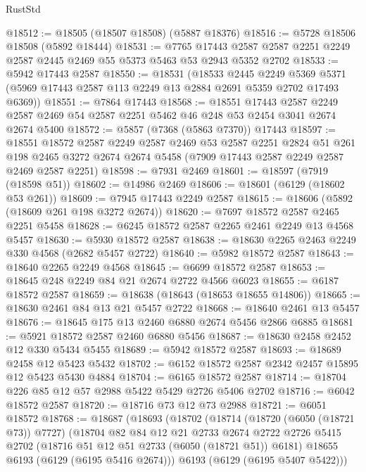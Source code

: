 \begin{lexlean}{RustStd}
\begin{coremodule}
@18512 := @18505 (@18507 @18508) (@5887 @18376)
@18516 := @5728 @18506 @18508 (@5892 @18444)
@18531 := @7765
    @17443
    @2587
    @2587
    @2251
    @2249
    @2587
    @2445
    @2469
    @55
    @5373
    @5463
    @53
    @2943
    @5352
    @2702
@18533 := @5942 @17443 @2587
@18550 := @18531
    (@18533
      @2445
      @2249
      @5369
      @5371
      (@5969 @17443 @2587 @113 @2249 @13 @2884 @2691 @5359 @2702 @17493 @6369))
@18551 := @7864 @17443
@18568 := @18551
    @17443
    @2587
    @2249
    @2587
    @2469
    @54
    @2587
    @2251
    @5462
    @46
    @248
    @53
    @2454
    @3041
    @2674
    @2674
    @5400
@18572 := @5857 (@7368 (@5863 @7370)) @17443
@18597 := @18551
    @18572
    @2587
    @2249
    @2587
    @2469
    @53
    @2587
    @2251
    @2824
    @51
    @261
    @198
    @2465
    @3272
    @2674
    @2674
    @5458
    (@7909 @17443 @2587 @2249 @2587 @2469 @2587 @2251)
@18598 := @7931 @2469
@18601 := @18597 (@7919 (@18598 @51))
@18602 := @14986 @2469
@18606 := @18601 (@6129 (@18602 @53 @261))
@18609 := @7945 @17443 @2249 @2587
@18615 := @18606 (@5892 (@18609 @261 @198 @3272 @2674))
@18620 := @7697 @18572 @2587 @2465 @2251 @5458
@18628 := @6245 @18572 @2587 @2265 @2461 @2249 @13 @4568 @5457
@18630 := @5930 @18572 @2587
@18638 := @18630 @2265 @2463 @2249 @330 @4568 (@2682 @5457 @2722)
@18640 := @5982 @18572 @2587
@18643 := @18640 @2265 @2249 @4568
@18645 := @6699 @18572 @2587
@18653 := @18645 @248 @2249 @84 @21 @2674 @2722 @4566 @6023
@18655 := @6187 @18572 @2587
@18659 := @18638 (@18643 (@18653 @18655 @14806))
@18665 := @18630 @2461 @84 @13 @21 @5457 @2722
@18668 := @18640 @2461 @13 @5457
@18676 := @18645 @175 @13 @2460 @6880 @2674 @5456 @2866 @6885
@18681 := @5921 @18572 @2587 @2460 @6880 @5456
@18687 := @18630 @2458 @2452 @12 @330 @5434 @5455
@18689 := @5942 @18572 @2587
@18693 := @18689 @2458 @12 @5423 @5432
@18702 := @6152 @18572 @2587 @2342 @2457 @15895 @12 @5423 @5430 @4884
@18704 := @6165 @18572 @2587
@18714 := @18704 @226 @85 @12 @57 @2988 @5422 @5429 @2726 @5406 @2702
@18716 := @6042 @18572 @2587
@18720 := @18716 @73 @12 @73 @2988
@18721 := @6051 @18572
@18768 := @18687
    (@18693
      (@18702
        (@18714
          (@18720 (@6050 (@18721 @73)) @7727)
          (@18704
            @82
            @84
            @12
            @21
            @2733
            @2674
            @2722
            @2726
            @5415
            @2702
            (@18716 @51 @12 @51 @2733 (@6050 (@18721 @51)) @6181)
            @18655
            @6193
            (@6129 (@6195 @5416 @2674)))
          @6193
          (@6129 (@6195 @5407 @5422)))

\end{coremodule}
\end{lexlean}
